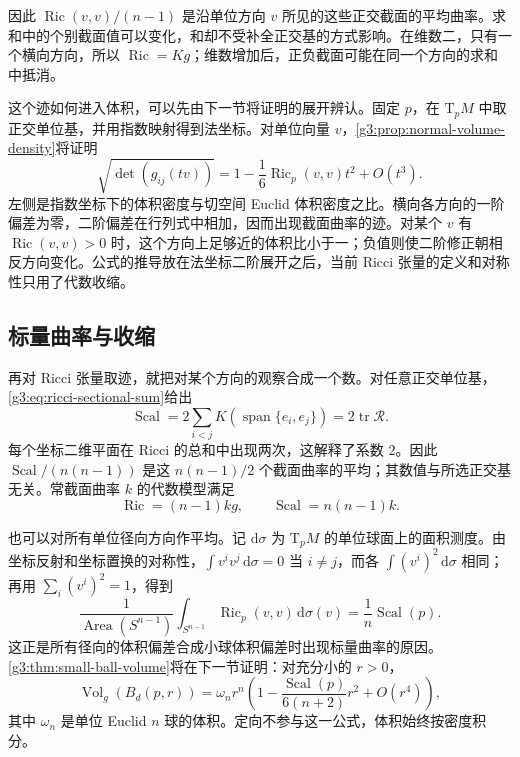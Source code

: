 因此 \(\operatorname{Ric}(v,v)/(n-1)\) 是沿单位方向 \(v\) 所见的这些正交截面的平均曲率。求和中的个别截面值可以变化，和却不受补全正交基的方式影响。在维数二，只有一个横向方向，所以 \(\operatorname{Ric}=Kg\)；维数增加后，正负截面可能在同一个方向的求和中抵消。

\ProseParagraphBreak

这个迹如何进入体积，可以先由下一节将证明的展开辨认。固定 \(p\)，在 \(\mathrm{T}_pM\) 中取正交单位基，并用指数映射得到法坐标。对单位向量 \(v\)，\cref{g3:prop:normal-volume-density}将证明
\begin{equation}
	\label{g3:eq:ricci-volume-direction}
	\sqrt{\det(g_{ij}(tv))}
	=1-\frac16\operatorname{Ric}_p(v,v)t^2+O(t^3).
\end{equation}
左侧是指数坐标下的体积密度与切空间 Euclid 体积密度之比。横向各方向的一阶偏差为零，二阶偏差在行列式中相加，因而出现截面曲率的迹。对某个 \(v\) 有 \(\operatorname{Ric}(v,v)>0\) 时，这个方向上足够近的体积比小于一；负值则使二阶修正朝相反方向变化。公式的推导放在法坐标二阶展开之后，当前 Ricci 张量的定义和对称性只用了代数收缩。

\subsection{标量曲率与收缩}
\label{g3:subsec:0302:03}

再对 Ricci 张量取迹，就把对某个方向的观察合成一个数。对任意正交单位基，\eqref{g3:eq:ricci-sectional-sum}给出
\begin{equation}
	\label{g3:eq:scalar-sectional-average}
	\operatorname{Scal}
	=2\sum_{i<j}K(\operatorname{span}\{e_i,e_j\})
	=2\operatorname{tr}\mathcal R.
\end{equation}
每个坐标二维平面在 Ricci 的总和中出现两次，这解释了系数 \(2\)。因此 \(\operatorname{Scal}/(n(n-1))\) 是这 \(n(n-1)/2\) 个截面曲率的平均；其数值与所选正交基无关。常截面曲率 \(k\) 的代数模型满足
\[
	\operatorname{Ric}=(n-1)kg,\qquad
	\operatorname{Scal}=n(n-1)k.
\]

\ProseParagraphBreak

也可以对所有单位径向方向作平均。记 \(\mathrm{d}\sigma\) 为 \(\mathrm{T}_pM\) 的单位球面上的面积测度。由坐标反射和坐标置换的对称性，\(\int v^iv^j\,\mathrm{d}\sigma=0\) 当 \(i\ne j\)，而各 \(\int(v^i)^2\,\mathrm{d}\sigma\) 相同；再用 \(\sum_i(v^i)^2=1\)，得到
\[
	\frac1{\operatorname{Area}(S^{n-1})}
	\int_{S^{n-1}}\operatorname{Ric}_p(v,v)\,\mathrm{d}\sigma(v)
	=\frac1n\operatorname{Scal}(p).
\]
这正是所有径向的体积偏差合成小球体积偏差时出现标量曲率的原因。\cref{g3:thm:small-ball-volume}将在下一节证明：对充分小的 \(r>0\)，
\begin{equation}
	\label{g3:eq:scalar-small-ball-preview}
	\operatorname{Vol}_g(B_d(p,r))
	=\omega_n r^n\left(1-\frac{\operatorname{Scal}(p)}{6(n+2)}r^2+O(r^4)\right),
\end{equation}
其中 \(\omega_n\) 是单位 Euclid \(n\) 球的体积。定向不参与这一公式，体积始终按密度积分。

